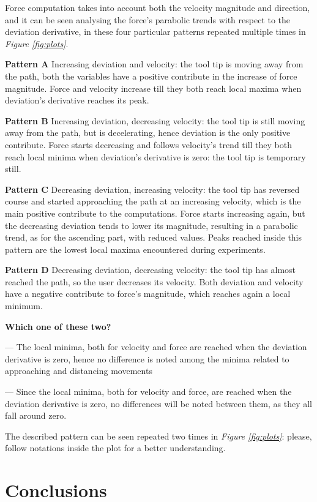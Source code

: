 \documentclass[conference]{IEEEtran}
\begin{document}
    Force computation takes into account both the velocity magnitude and
    direction, and it can be seen analysing the force’s parabolic trends
    with respect to the deviation derivative, in these four particular
    patterns repeated multiple times in \textit{Figure \ref{fig:plots}}.

    \textbf{Pattern A  } Increasing deviation and velocity: the tool tip
    is moving away from the path, both the variables have a positive
    contribute in the increase of force magnitude. Force and velocity
    increase till they both reach local maxima when deviation’s derivative
    reaches its peak.

    \textbf{Pattern B }  Increasing deviation, decreasing velocity: the
    tool tip is still moving away from the path, but is decelerating,
    hence deviation is the only positive contribute. Force starts
    decreasing and follows velocity’s trend till they both reach local
    minima when deviation’s derivative is zero: the tool tip is temporary
    still.

    \textbf{Pattern C } Decreasing deviation, increasing velocity: the
    tool tip has reversed course and started approaching the path at an
    increasing velocity, which is the main positive contribute to the
    computations. Force starts increasing again, but the decreasing
    deviation tends to lower its magnitude, resulting in a parabolic
    trend, as for the ascending part, with reduced values. Peaks reached
    inside this pattern are the lowest local maxima encountered during
    experiments.

    \textbf{Pattern D }  Decreasing deviation, decreasing velocity: the
    tool tip has almost reached the path, so the user decreases its
    velocity. Both deviation and velocity have a negative contribute to
    force’s magnitude, which reaches again a local minimum. 


    \textbf{Which one of these two?}

    --- The local minima, both for velocity and force are reached when the
    deviation derivative is zero, hence no difference is noted among the
    minima related to approaching and distancing movements

    --- Since the local minima, both for velocity and force, are reached
    when the deviation derivative is zero, no differences will be noted
    between them, as they all fall around zero.


    The described pattern can be seen repeated two times in \textit{Figure
    \ref{fig:plots}}: please, follow notations inside the plot for a
    better understanding.

\section{Conclusions}



\end{document}
